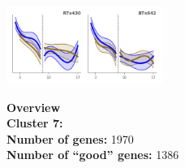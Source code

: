 \begin{multicols}{2}
\includegraphics[width=2in]{figures/clusters/root_Preflowering_6.png}
\columnbreak

\noindent \textbf{Overview}\\\textbf{Cluster 7:}  \\
\textbf{Number of genes:} 1970 \\
\textbf{Number of ``good'' genes:} 1386 \\
\end{multicols}

